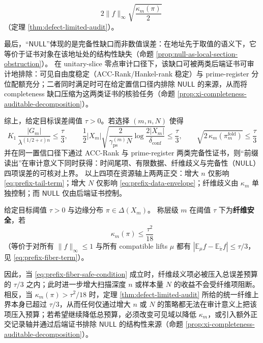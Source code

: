 \begin{theorem}
\begin{equation}
{2\|f\|_\infty\sqrt{\frac{\kappa_m(\pi)}{2}}\;}
\end{equation}
（定理 \ref{thm:defect-limited-audit}）。
\par
最后，“\(\mathsf{NULL}\)”体现的是完备性缺口而非数值误差：在地址先于取值的语义下，它等价于证书对象在该地址处的结构性缺失（命题 \ref{prop:null-as-local-section-obstruction}）。
在 unitary-slice 零点审计口径下，该缺口可被两类后端证书可审计地排除：可见自由度稳定（ACC-Rank/Hankel-rank 稳定）与 prime-register 分位配额充分；二者同时满足时可在给定置信口径内排除 \(\mathsf{NULL}\) 的来源，从而将 completeness 缺口压缩为这两类证书的核验任务（命题 \ref{prop:xi-completeness-auditable-decomposition}）。
\par
综上，给定目标误差阈值 \(\tau>0\)。若选择 \((m,n,N)\) 使得
\begin{equation}\label{eq:prefix-audit-budget-sufficient}
\boxed{\;
K_1\,\frac{|G_m|}{\lambda^{(1/2+\varepsilon)n}}\le \frac{\tau}{3},
\qquad
\frac12|X_m|\sqrt{\frac{2}{\gamma_{\mathrm{ps}}^{(m)}N}\log\frac{2|X_m|}{\delta_{\mathrm{conf}}}}\le \frac{\tau}{3},
\qquad
\sqrt{2\,\kappa_m(\pi_m^{\mathrm{fold}})}\le \frac{\tau}{3}\;}
\end{equation}
并在同一置信口径下通过 ACC-Rank 与 prime-register 两类完备性证书，则“前缀读出”在审计意义下同时获得：时间尾项、有限数据、纤维歧义与完备性（\(\mathsf{NULL}\)）四项误差的可核对上界。
以上四项在资源轴上两两正交：增大 \(n\) 仅影响 \eqref{eq:prefix-tail-term}；增大 \(N\) 仅影响 \eqref{eq:prefix-data-envelope}；纤维歧义由 \(\kappa_m\) 单独控制；而 \(\mathsf{NULL}\) 仅由后端证书控制。
\end{theorem}

\begin{corollary}[可审计的安全分辨率与停止律]\label{cor:prefix-audit-safe-resolution-stopping}
给定目标阈值 \(\tau>0\) 与边缘分布 \(\pi\in\Delta(X_m)\)。
称层级 \(m\) 在阈值 \(\tau\) 下为\textbf{纤维安全}，若
\begin{equation}\label{eq:prefix-fiber-safe-condition}
\boxed{\;\kappa_m(\pi)\le \frac{\tau^2}{18}\;}
\end{equation}
（等价于对所有 \(\|f\|_\infty\le 1\) 与所有 compatible lifts \(\mu\) 都有 \(|\mathbb{E}_\mu f-\mathbb{E}_{\widetilde\pi}f|\le \tau/3\)，见 \eqref{eq:prefix-fiber-term}）。
\par
因此，当 \eqref{eq:prefix-fiber-safe-condition} 成立时，纤维歧义项必被压入总误差预算的 \(\tau/3\) 之内；此时进一步增大扫描深度 \(n\) 或样本量 \(N\) 的收益不会受纤维项阻断。
相反，当 \(\kappa_m(\pi)>\tau^2/18\) 时，定理 \ref{thm:defect-limited-audit} 所给的统一纤维上界本身已超过 \(\tau/3\)，从而任何仅通过增大 \(n\) 或 \(N\) 的策略都无法在审计意义上把该项压入预算；若希望继续降低总预算，必须改变可见域以降低 \(\kappa_m\)，或引入额外正交记录轴并通过后端证书排除 \(\mathsf{NULL}\) 的结构性来源（命题 \ref{prop:xi-completeness-auditable-decomposition}）。
\end{corollary}

